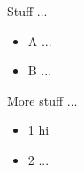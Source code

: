 Stuff ...
	
\begin{itemize}
 \item A ...
 \item B ...
\end{itemize}

More stuff ...

\begin{itemize}
 \item 1 hi
 \item 2 ...
\end{itemize}

\lipsum[1-6]
